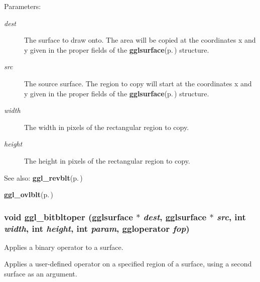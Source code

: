 \begin{Desc}
\item[Parameters:]
\begin{description}
\item[{\em dest}]The surface to draw onto. The area will be copied at the coordinates x and y given in the proper fields of the {\bf gglsurface}{\rm (p.\,\pageref{structgglsurface})} structure. \item[{\em src}]The source surface. The region to copy will start at the coordinates x and y given in the proper fields of the {\bf gglsurface}{\rm (p.\,\pageref{structgglsurface})} structure. \item[{\em width}]The width in pixels of the rectangular region to copy. \item[{\em height}]The height in pixels of the rectangular region to copy.\end{description}
\end{Desc}
\begin{Desc}
\item[See also:]{\bf ggl\_\-revblt}{\rm (p.\,\pageref{ggl_8h_a20})} 

{\bf ggl\_\-ovlblt}{\rm (p.\,\pageref{ggl_8h_a21})} \end{Desc}
\subsubsection{\setlength{\rightskip}{0pt plus 5cm}void ggl\_\-bitbltoper ({\bf gglsurface} $\ast$ {\em dest}, {\bf gglsurface} $\ast$ {\em src}, int {\em width}, int {\em height}, int {\em param}, {\bf ggloperator} {\em fop})}\label{ggl_8h_a27}


Applies a binary operator to a surface. 

Applies a user-defined operator on a specified region of a surface, using a second surface as an argument.

